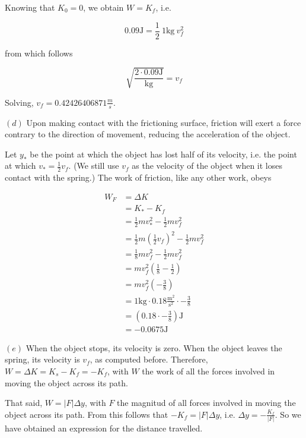 \documentclass[12pt]{article}
\theoremstyle{definition}
\begin{document}
Knowing that $K_0 = 0$, we obtain $W = K_f$, i.e. 

\begin{equation*}
    0.09\text{J} = \frac{1}{2} ~ \text{1kg} ~ v_f^2
\end{equation*}

from which follows 

\begin{equation*}
     \sqrt{\frac{ 2 \cdot 0.09\text{J}  }{\text{kg}}}   = v_f
\end{equation*}

Solving, $v_f = 0.42426406871 \frac{m}{s}$.

$(d)$ Upon making contact with the frictioning surface, friction will exert a
force contrary to the direction of movement, reducing the acceleration of the
object. 

Let $y_*$ be the point at which the object has lost half of its velocity, i.e.
the point at which $v_* = \frac{1}{2} v_f$. (We still use $v_f$ as the velocity
of the object when it loses contact with the spring.) The work of friction, like
any other work, obeys

\begin{align*}
    W_F &= \Delta K \\ 
    &= K_* - K_f\\ 
    &= \frac{1}{2} m v_*^2 - \frac{1}{2}mv_f^2 \\ 
    &= \frac{1}{2}m \left( \frac{1}{2} v_f \right)^2 - \frac{1}{2}m v_f^2 \\ 
    &= \frac{1}{8}m v_f^2 - \frac{1}{2}m v_f^2 \\ 
    &= mv_f^2\left( \frac{1}{8} - \frac{1}{2} \right) \\ 
    &= mv_f^2 \left(  -\frac{3}{8} \right) \\ 
    &= \text{1kg} \cdot 0.18 \frac{\text{m}^2}{\text{s}^2} \cdot -\frac{3}{8} \\ 
    &= \left( 0.18 \cdot -\frac{3}{8} \right) \text{J} \\ 
    &= -0.0675 \text{J}
\end{align*}

$(e)$ When the object stops, its velocity is zero. When the object leaves the
spring, its velocity is $v_f$, as computed before. Therefore, $W = \Delta K =
K_s - K_f = -K_f$, with $W$ the work of all the forces involved in moving the
object across its path.

That said, $W = \left| F \right|\Delta y $, with $F$ the magnitud of all forces
involved in moving the object across its path. From this follows that $-K_f =
\left| F \right| \Delta y$, i.e. $\Delta y = -\frac{K_f}{\left| F \right| }$. So
we have obtained an expression for the distance travelled.
\end{document}
